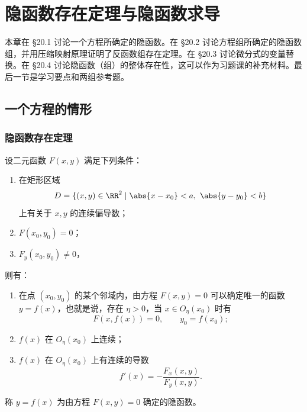 \chapter{隐函数存在定理与隐函数求导}


本章在 §20.1 讨论一个方程所确定的隐函数。在 §20.2 讨论方程组所确定的隐函数组，并用压缩映射原理证明了反函数组存在定理。在 §20.3 讨论微分式的变量替换。在 §20.4 讨论隐函数（组）的整体存在性，这可以作为习题课的补充材料。最后一节是学习要点和两组参考题。

\section{一个方程的情形}

\subsection{隐函数存在定理}

\begin{xproposition}[20.1.1（隐函数存在定理）]
设二元函数 $F(x,y)$ 满足下列条件：
\begin{enumerate}[label=(\arabic*)]
  \item 在矩形区域
  \[
    D=\{(x,y)\in\RR^2\mid \abs{x-x_0}<a,\ \abs{y-y_0}<b\}
  \]
  上有关于 $x,y$ 的连续偏导数；
  \item $F(x_0,y_0)=0$；
  \item $F_y(x_0,y_0)\ne0$，
\end{enumerate}
则有：
\begin{enumerate}[label=(\arabic*)]
  \item 在点 $(x_0,y_0)$ 的某个邻域内，由方程 $F(x,y)=0$ 可以确定唯一的函数 $y=f(x)$，也就是说，存在 $\eta>0$，当 $x\in O_\eta(x_0)$ 时有
  \[
    F(x,f(x))=0,\qquad y_0=f(x_0);
  \]
  \item $f(x)$ 在 $O_\eta(x_0)$ 上连续；
  \item $f(x)$ 在 $O_\eta(x_0)$ 上有连续的导数
  \begin{equation}
    f'(x)=-\frac{F_x(x,y)}{F_y(x,y)}.
    \tag{20.1}
    \label{eq:20.1}
  \end{equation}
\end{enumerate}
称 $y=f(x)$ 为由方程 $F(x,y)=0$ 确定的隐函数。
\end{xproposition}

